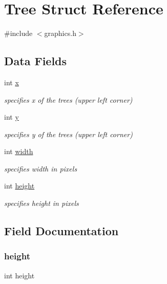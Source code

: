 \hypertarget{struct_tree}{}\section{Tree Struct Reference}
\label{struct_tree}


{\ttfamily \#include $<$graphics.\+h$>$}

\subsection*{Data Fields}
\begin{DoxyCompactItemize}
\item 
int \hyperlink{struct_tree_a6150e0515f7202e2fb518f7206ed97dc}{x}
\begin{DoxyCompactList}\small\item\em specifies x of the trees (upper left corner) \end{DoxyCompactList}\item 
int \hyperlink{struct_tree_a0a2f84ed7838f07779ae24c5a9086d33}{y}
\begin{DoxyCompactList}\small\item\em specifies y of the trees (upper left corner) \end{DoxyCompactList}\item 
int \hyperlink{struct_tree_a2474a5474cbff19523a51eb1de01cda4}{width}
\begin{DoxyCompactList}\small\item\em specifies width in pixels \end{DoxyCompactList}\item 
int \hyperlink{struct_tree_ad12fc34ce789bce6c8a05d8a17138534}{height}
\begin{DoxyCompactList}\small\item\em specifies height in pixels \end{DoxyCompactList}\end{DoxyCompactItemize}


\subsection{Field Documentation}
\mbox{\label{struct_tree_ad12fc34ce789bce6c8a05d8a17138534}} 
\subsubsection{\texorpdfstring{height}{height}}
{\footnotesize\ttfamily int height}



